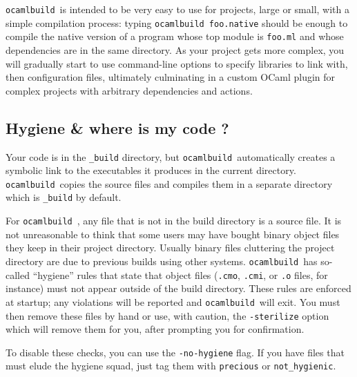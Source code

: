 \documentclass[12pt]{article}
\newcommand{\ocb}{\texttt{ocamlbuild}~}
\begin{document}
\ocb is intended to be very easy to use for projects, large or small, with a simple
compilation process: typing
\texttt{ocamlbuild foo.native} should be enough to compile the native version
of a program whose top module is \texttt{foo.ml} and whose dependencies are in
the same directory.  As your project gets more complex, you will gradually
start to use command-line options to specify libraries to link with, then
configuration files, ultimately culminating in a custom OCaml plugin for
complex projects with arbitrary dependencies and actions.

\subsection{Hygiene \& where is my code ?}
Your code is in the \texttt{\_build} directory, but \ocb automatically creates
a symbolic link to the executables it produces in the current directory.
\ocb copies the source files and compiles them in a separate directory
which is \texttt{\_build} by default.  

For \ocb, any file that is not in the build directory is a source file.
It is not unreasonable to think that some users may have bought binary object files
they keep in their project directory.  Usually binary files cluttering the project
directory are due to previous builds using other systems.  \ocb has so-called
``hygiene'' rules that state that object files (\texttt{.cmo}, \texttt{.cmi},
or \texttt{.o} files, for instance) must not appear outside of the build
directory.  These rules are enforced at startup; any violations will be reported
and \ocb will exit.  You must then remove these files by hand or use, with caution,
the \texttt{-sterilize} option which will remove them for you, after prompting
you for confirmation.

To disable these checks, you can use the \texttt{-no-hygiene} flag.  If you have
files that must elude the hygiene squad, just tag them with \texttt{precious}
or \texttt{not\_hygienic}.
\end{document}
